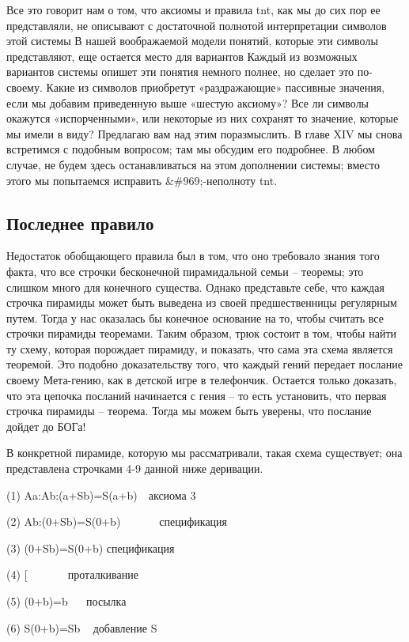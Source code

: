 \documentclass[../main.tex]{subfiles}
\begin{document}
Все это говорит нам о том, что аксиомы и правила \acs{tnt}, как мы до сих пор ее представляли, не описывают с достаточной полнотой интерпретации символов этой системы В нашей воображаемой модели понятий, которые эти символы представляют, еще остается место для вариантов Каждый из возможных вариантов системы опишет эти понятия немного полнее, но сделает это по-своему. Какие из символов приобретут «раздражающие» пассивные значения, если мы добавим приведенную выше «шестую аксиому»? Все ли символы окажутся «испорченными», или некоторые из них сохранят то значение, которые мы имели в виду? Предлагаю вам над этим поразмыслить. В главе XIV мы снова встретимся с подобным вопросом; там мы обсудим его подробнее. В любом случае, не будем здесь останавливаться на этом дополнении системы; вместо этого мы попытаемся исправить \&\#969;-неполноту \acs{tnt}.


\subsection{Последнее правило}

Недостаток обобщающего правила был в том, что оно требовало знания того факта, что все строчки бесконечной пирамидальной семьи \--- теоремы; это слишком много для конечного существа. Однако представьте себе, что каждая строчка пирамиды может быть выведена из своей предшественницы регулярным путем. Тогда у нас оказалась бы конечное основание на то, чтобы считать все строчки пирамиды теоремами. Таким образом, трюк состоит в том, чтобы найти ту схему, которая порождает пирамиду, и показать, что сама эта схема является теоремой. Это подобно доказательству того, что каждый гений передает послание своему Мета-гению, как в детской игре в телефончик. Остается только доказать, что эта цепочка посланий начинается с гения \--- то есть установить, что первая строчка пирамиды \--- теорема. Тогда мы можем быть уверены, что послание дойдет до БОГа!

В конкретной пирамиде, которую мы рассматривали, такая схема существует; она представлена строчками 4-9 данной ниже деривации.

(1) Aa:Ab:(a+Sb)=S(a+b)~~аксиома 3

(2) Ab:(0+Sb)=S(0+b)~~~~~~~спецификация

(3) (0+Sb)=S(0+b) спецификация

(4) {[} ~~~~~~ проталкивание

(5) (0+b)=b ~~ посылка

(6) S(0+b)=Sb ~ добавление S
\end{document}
